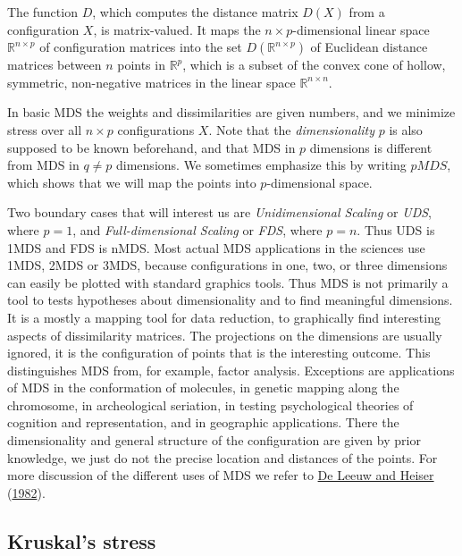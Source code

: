 \documentclass[
  12pt,
]{book}
\theoremstyle{definition}
\theoremstyle{definition}
\theoremstyle{definition}
\theoremstyle{definition}
\theoremstyle{remark}
\begin{document}
The function \(D\), which computes the distance matrix \(D(X)\) from a configuration \(X\), is matrix-valued. It maps the \(n\times p\)-dimensional
linear space \(\mathbb{R}^{n\times p}\) of configuration matrices into the
set \(D(\mathbb{R}^{n\times p})\) of Euclidean distance matrices between \(n\) points in \(\mathbb{R}^p\), which is a subset of the convex cone of hollow, symmetric, non-negative matrices in the linear space \(\mathbb{R}^{n\times n}\).

In basic MDS the weights and dissimilarities are given
numbers, and we minimize stress over all \(n\times p\) configurations \(X\).
Note that the \emph{dimensionality} \(p\) is also supposed to be known
beforehand, and that MDS in \(p\) dimensions is different from MDS in
\(q\not= p\) dimensions. We sometimes emphasize this by writing \(pMDS\),
which shows that we will map the points into \(p\)-dimensional space.

Two boundary cases that will interest us are \emph{Unidimensional Scaling} or
\emph{UDS}, where \(p=1\), and \emph{Full-dimensional Scaling} or \emph{FDS}, where
\(p=n\). Thus UDS is 1MDS and FDS is nMDS. Most actual MDS applications in the sciences use 1MDS, 2MDS or 3MDS, because configurations in one, two, or three dimensions can easily be plotted with standard graphics tools. Thus MDS is not primarily a tool to tests hypotheses about dimensionality and to find meaningful dimensions. It is a mostly a mapping tool for data reduction, to graphically find interesting aspects of dissimilarity matrices. The projections on the dimensions are usually ignored, it is the configuration of points that is the interesting outcome. This distinguishes MDS from, for example, factor analysis. Exceptions are applications of MDS in the conformation of molecules, in genetic mapping along the chromosome, in archeological seriation, in testing psychological theories of cognition and representation, and in geographic applications. There the dimensionality and general structure of the configuration are given by prior knowledge, we just do not the precise location and distances of the points. For more discussion of the different uses of MDS we refer to \protect\hyperlink{ref-deleeuw_heiser_C_82}{De Leeuw and Heiser} (\protect\hyperlink{ref-deleeuw_heiser_C_82}{1982}).

\hypertarget{kruskals-stress}{%
\subsection{Kruskal's stress}\label{kruskals-stress}}
\end{document}
